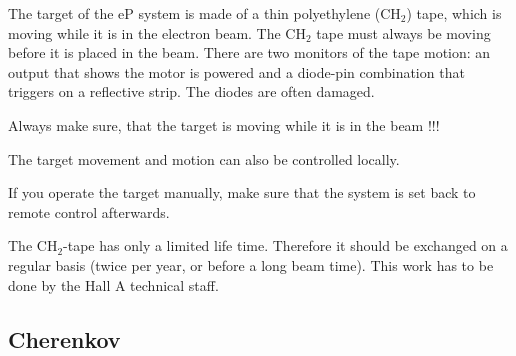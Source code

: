 {The target of the eP system is made of a thin polyethylene (CH$_2$) tape, which 
is moving while it is in the electron beam. 
The CH$_2$ tape  must always be moving before 
it is placed in the beam. There are two monitors of the tape motion:
an output that shows the motor is powered and a diode-pin combination 
that triggers on a reflective strip. The diodes are often damaged.\\
\begin{safetyen}{10}{5}
Always make sure, that the target is moving while it is in the beam !!!\\
\end{safetyen}
The target movement and motion can also be controlled locally.
\\
\begin{safetyen}{10}{5}
If you operate the target manually, make sure that the system
is set back to remote control afterwards.\\
\end{safetyen}
The CH$_2$-tape has only a limited life time. Therefore it
should be exchanged on a regular basis (twice per year, or 
before a long beam time). This work has to be done by the 
Hall A technical staff. 

\subsection{Cherenkov}
\label{sec:ep_cer}

}
